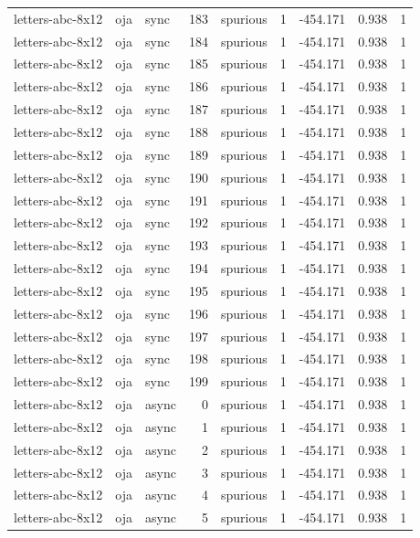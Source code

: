 \begin{tabular}{lllrlrrrr}
letters-abc-8x12 & oja & sync & 183 & spurious & 1 & -454.171 & 0.938 & 1 \\
letters-abc-8x12 & oja & sync & 184 & spurious & 1 & -454.171 & 0.938 & 1 \\
letters-abc-8x12 & oja & sync & 185 & spurious & 1 & -454.171 & 0.938 & 1 \\
letters-abc-8x12 & oja & sync & 186 & spurious & 1 & -454.171 & 0.938 & 1 \\
letters-abc-8x12 & oja & sync & 187 & spurious & 1 & -454.171 & 0.938 & 1 \\
letters-abc-8x12 & oja & sync & 188 & spurious & 1 & -454.171 & 0.938 & 1 \\
letters-abc-8x12 & oja & sync & 189 & spurious & 1 & -454.171 & 0.938 & 1 \\
letters-abc-8x12 & oja & sync & 190 & spurious & 1 & -454.171 & 0.938 & 1 \\
letters-abc-8x12 & oja & sync & 191 & spurious & 1 & -454.171 & 0.938 & 1 \\
letters-abc-8x12 & oja & sync & 192 & spurious & 1 & -454.171 & 0.938 & 1 \\
letters-abc-8x12 & oja & sync & 193 & spurious & 1 & -454.171 & 0.938 & 1 \\
letters-abc-8x12 & oja & sync & 194 & spurious & 1 & -454.171 & 0.938 & 1 \\
letters-abc-8x12 & oja & sync & 195 & spurious & 1 & -454.171 & 0.938 & 1 \\
letters-abc-8x12 & oja & sync & 196 & spurious & 1 & -454.171 & 0.938 & 1 \\
letters-abc-8x12 & oja & sync & 197 & spurious & 1 & -454.171 & 0.938 & 1 \\
letters-abc-8x12 & oja & sync & 198 & spurious & 1 & -454.171 & 0.938 & 1 \\
letters-abc-8x12 & oja & sync & 199 & spurious & 1 & -454.171 & 0.938 & 1 \\
letters-abc-8x12 & oja & async & 0 & spurious & 1 & -454.171 & 0.938 & 1 \\
letters-abc-8x12 & oja & async & 1 & spurious & 1 & -454.171 & 0.938 & 1 \\
letters-abc-8x12 & oja & async & 2 & spurious & 1 & -454.171 & 0.938 & 1 \\
letters-abc-8x12 & oja & async & 3 & spurious & 1 & -454.171 & 0.938 & 1 \\
letters-abc-8x12 & oja & async & 4 & spurious & 1 & -454.171 & 0.938 & 1 \\
letters-abc-8x12 & oja & async & 5 & spurious & 1 & -454.171 & 0.938 & 1 \\

\end{tabular}

